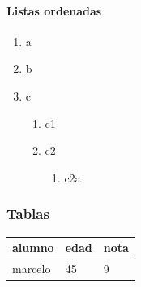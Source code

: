 \documentclass[
]{article}
\providecommand{\tightlist}{%
  \setlength{\itemsep}{0pt}\setlength{\parskip}{0pt}}
\begin{document}
\hypertarget{listas-ordenadas}{%
\paragraph{Listas ordenadas}\label{listas-ordenadas}}

\begin{enumerate}
\def\labelenumi{\arabic{enumi}.}
\tightlist
\item
  a
\item
  b
\item
  c

  \begin{enumerate}
  \def\labelenumii{\arabic{enumii}.}
  \tightlist
  \item
    c1
  \item
    c2

    \begin{enumerate}
    \def\labelenumiii{\arabic{enumiii}.}
    \tightlist
    \item
      c2a
    \end{enumerate}
  \end{enumerate}
\end{enumerate}

\hypertarget{tablas}{%
\subsubsection{Tablas}\label{tablas}}

\begin{longtable}[]{@{}lll@{}}
\toprule
alumno & edad & nota\tabularnewline
\midrule
\endhead
marcelo & 45 & 9\tabularnewline
\bottomrule
\end{longtable}
\end{document}
